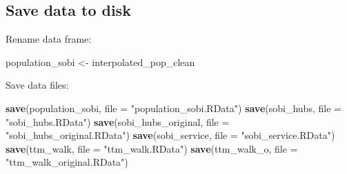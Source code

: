 \documentclass[
]{article}
\newenvironment{Shaded}{\begin{snugshade}}{\end{snugshade}}
\newcommand{\DataTypeTok}[1]{\textcolor[rgb]{0.13,0.29,0.53}{#1}}
\newcommand{\KeywordTok}[1]{\textcolor[rgb]{0.13,0.29,0.53}{\textbf{#1}}}
\newcommand{\NormalTok}[1]{#1}
\newcommand{\StringTok}[1]{\textcolor[rgb]{0.31,0.60,0.02}{#1}}
\begin{document}
\hypertarget{save-data-to-disk}{%
\subsection{Save data to disk}\label{save-data-to-disk}}

Rename data frame:

\begin{Shaded}
\begin{Highlighting}[]
\NormalTok{population_sobi <-}\StringTok{ }\NormalTok{interpolated_pop_clean}
\end{Highlighting}
\end{Shaded}

Save data files:

\begin{Shaded}
\begin{Highlighting}[]
\KeywordTok{save}\NormalTok{(population_sobi, }\DataTypeTok{file =} \StringTok{"population_sobi.RData"}\NormalTok{)}
\KeywordTok{save}\NormalTok{(sobi_hubs, }\DataTypeTok{file =} \StringTok{"sobi_hubs.RData"}\NormalTok{)}
\KeywordTok{save}\NormalTok{(sobi_hubs_original, }\DataTypeTok{file =} \StringTok{"sobi_hubs_original.RData"}\NormalTok{)}
\KeywordTok{save}\NormalTok{(sobi_service, }\DataTypeTok{file =} \StringTok{"sobi_service.RData"}\NormalTok{)}
\KeywordTok{save}\NormalTok{(ttm_walk, }\DataTypeTok{file =} \StringTok{"ttm_walk.RData"}\NormalTok{)}
\KeywordTok{save}\NormalTok{(ttm_walk_o, }\DataTypeTok{file =} \StringTok{"ttm_walk_original.RData"}\NormalTok{)}
\end{Highlighting}
\end{Shaded}
\end{document}

